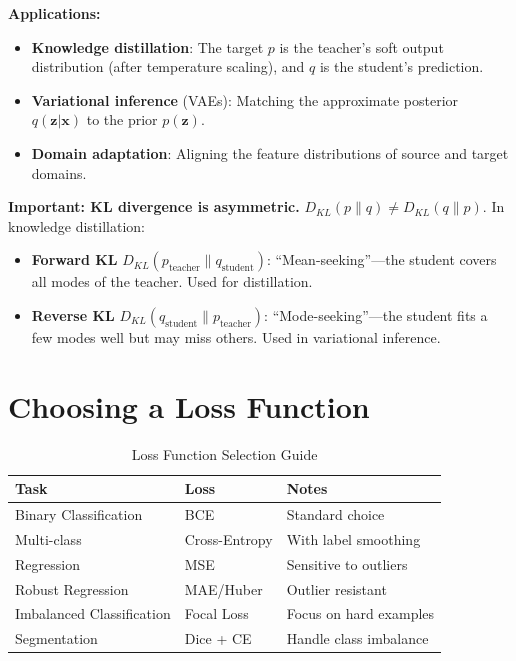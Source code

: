 \textbf{Applications:}
\begin{itemize}
    \item \textbf{Knowledge distillation}: The target $p$ is the teacher's soft output distribution (after temperature scaling), and $q$ is the student's prediction.
    \item \textbf{Variational inference} (VAEs): Matching the approximate posterior $q(\mathbf{z}|\mathbf{x})$ to the prior $p(\mathbf{z})$.
    \item \textbf{Domain adaptation}: Aligning the feature distributions of source and target domains.
\end{itemize}

\textbf{Important: KL divergence is asymmetric.} $D_{KL}(p \| q) \neq D_{KL}(q \| p)$. In knowledge distillation:
\begin{itemize}
    \item \textbf{Forward KL} $D_{KL}(p_{\text{teacher}} \| q_{\text{student}})$: ``Mean-seeking''---the student covers all modes of the teacher. Used for distillation.
    \item \textbf{Reverse KL} $D_{KL}(q_{\text{student}} \| p_{\text{teacher}})$: ``Mode-seeking''---the student fits a few modes well but may miss others. Used in variational inference.
\end{itemize}

\section{Choosing a Loss Function}

\begin{table}[ht]
    \centering
    \caption{Loss Function Selection Guide}
    \begin{tabular}{L{2.5cm} L{4cm} L{4cm}}
        \toprule
        \textbf{Task} & \textbf{Loss} & \textbf{Notes} \\
        \midrule
        Binary Classification & BCE & Standard choice \\
        Multi-class & Cross-Entropy & With label smoothing \\
        Regression & MSE & Sensitive to outliers \\
        Robust Regression & MAE/Huber & Outlier resistant \\
        Imbalanced Classification & Focal Loss & Focus on hard examples \\
        Segmentation & Dice + CE & Handle class imbalance \\
        \bottomrule
    \end{tabular}
\end{table}

